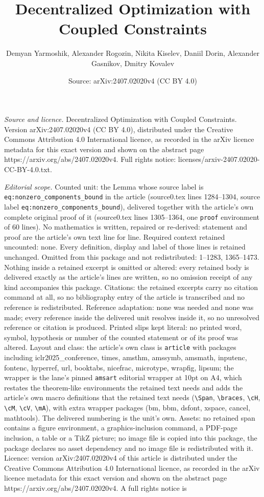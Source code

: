 \documentclass[10pt,a4paper]{amsart}
\title[Decentralized Optimization with Coupled Constraints]{Decentralized Optimization with Coupled Constraints}
\author{Demyan Yarmoshik, Alexander Rogozin, Nikita Kiselev, Daniil Dorin, Alexander Gasnikov, Dmitry Kovalev}
\date{Source: arXiv:2407.02020v4 (CC BY 4.0)}
\begin{document}
\maketitle

\noindent\emph{Source and licence.} Decentralized Optimization with Coupled Constraints. Version arXiv:2407.02020v4 (CC BY 4.0), distributed under the Creative Commons Attribution 4.0 International licence, as recorded in the arXiv licence metadata for this exact version and shown on the abstract page https://arxiv.org/abs/2407.02020v4. Full rights notice: licenses/arxiv-2407.02020-CC-BY-4.0.txt.\par\smallskip

\noindent\textit{Editorial scope.} Counted unit: the Lemma whose source label is \texttt{eq:nonzero\_components\_bound} in the article (source0.tex lines 1284--1304, source label \texttt{eq:nonzero\_components\_bound}), delivered together with the article's own complete original proof of it (source0.tex lines 1305--1364, one \texttt{proof} environment of 60 lines). No mathematics is written, repaired or re-derived: statement and proof are the article's own text line for line. Required context retained uncounted: none. Every definition, display and label of those lines is retained unchanged. Omitted from this package and not redistributed: 1--1283, 1365--1473. Nothing inside a retained excerpt is omitted or altered: every retained body is delivered exactly as the article's lines are written, so no omission receipt of any kind accompanies this package. Citations: the retained excerpts carry no citation command at all, so no bibliography entry of the article is transcribed and no reference is redistributed. Reference adaptation: none was needed and none was made; every reference inside the delivered unit resolves inside it, so no unresolved reference or citation is produced. Printed slips kept literal: no printed word, symbol, hypothesis or number of the counted statement or of its proof was altered. Layout and class: the article's own class is \texttt{article} with packages including iclr2025\_conference, times, amsthm, amssymb, amsmath, inputenc, fontenc, hyperref, url, booktabs, nicefrac, microtype, wrapfig, lipsum; the wrapper is the lane's pinned \texttt{amsart} editorial wrapper at 10pt on A4, which restates the theorem-like environments the retained text needs and adds the article's own macro definitions that the retained text needs (\texttt{\textbackslash Span}, \texttt{\textbackslash braces}, \texttt{\textbackslash cH}, \texttt{\textbackslash cM}, \texttt{\textbackslash cV}, \texttt{\textbackslash mA}), with extra wrapper packages (bm, bbm, dsfont, xspace, cancel, mathtools). The delivered numbering is the unit's own. Assets: no retained span contains a figure environment, a graphics-inclusion command, a PDF-page inclusion, a table or a TikZ picture; no image file is copied into this package, the package declares no asset dependency and no image file is redistributed with it. Licence: version arXiv:2407.02020v4 of this article is distributed under the Creative Commons Attribution 4.0 International licence, as recorded in the arXiv licence metadata for this exact version and shown on the abstract page https://arxiv.org/abs/2407.02020v4. A full rights notice is 
\end{document}
